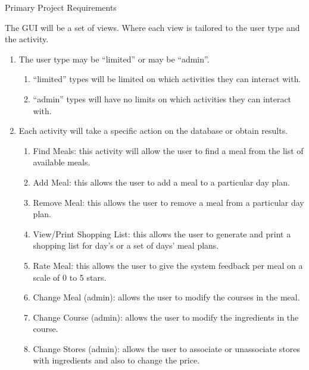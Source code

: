 \documentclass[a4paper,10pt,toc=graduated]{article}
\begin{document}
\begin{mySubsection}{Primary Project Requirements}
\begin{enumerate}
\begin{enumerate}
The GUI will be a set of views. Where each view is tailored to the user type and the activity.
\begin{enumerate}
\item
The user type may be “limited” or may be “admin”.
\begin{enumerate}
\item
“limited” types will be limited on which activities they can interact with.
\item
“admin” types will have no limits on which activities they can interact with.
\end{enumerate}
\item
Each activity will take a specific action on the database or obtain results.
\begin{enumerate}
\item
Find Meals: this activity will allow the user to find a meal from the list of available meals.
\item
Add Meal: this allows the user to add a meal to a particular day plan.
\item
Remove Meal: this allows the user to remove a meal from a particular day plan.
\item
View/Print Shopping List: this allows the user to generate and print a shopping list for day’s or a set of days’ meal plans.
\item
Rate Meal: this allows the user to give the system feedback per meal on a scale of 0 to 5 stars.
\item
Change Meal (admin): allows the user to modify the courses in the meal.
\item
Change Course (admin): allows the user to modify the ingredients in the course.
\item
Change Stores (admin): allows the user to associate or unassociate stores with ingredients and also to change the price.
\end{enumerate}
\end{enumerate}
\end{enumerate}
\end{enumerate}
\end{mySubsection}
\end{document}
